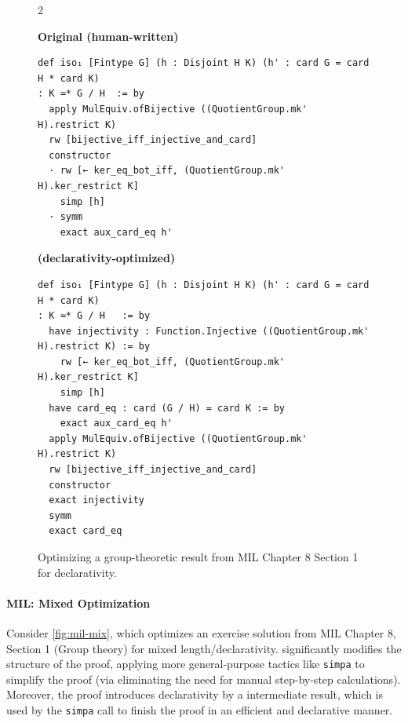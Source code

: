 \setlength{\columnsep}{0.2cm}
\begin{figure}[ht]
\begin{multicols}{2}

{
\textbf{Original (human-written)}
\begin{scriptsize}
\begin{lstlisting}[basicstyle=\scriptsize\ttfamily]
def iso₁ [Fintype G] (h : Disjoint H K) (h' : card G = card H * card K) 
: K ≃* G / H  := by
  apply MulEquiv.ofBijective ((QuotientGroup.mk' H).restrict K)
  rw [bijective_iff_injective_and_card]
  constructor
  · rw [← ker_eq_bot_iff, (QuotientGroup.mk' H).ker_restrict K]
    simp [h]
  · symm
    exact aux_card_eq h'
\end{lstlisting}
\end{scriptsize}
}
\vfill\null
\columnbreak
{
\textbf{\methodname{} (declarativity-optimized)}
\begin{scriptsize}
\begin{lstlisting}[basicstyle=\scriptsize\ttfamily]
def iso₁ [Fintype G] (h : Disjoint H K) (h' : card G = card H * card K) 
: K ≃* G / H   := by
  have injectivity : Function.Injective ((QuotientGroup.mk' H).restrict K) := by
    rw [← ker_eq_bot_iff, (QuotientGroup.mk' H).ker_restrict K]
    simp [h]
  have card_eq : card (G / H) = card K := by
    exact aux_card_eq h'
  apply MulEquiv.ofBijective ((QuotientGroup.mk' H).restrict K)
  rw [bijective_iff_injective_and_card]
  constructor
  exact injectivity
  symm
  exact card_eq
\end{lstlisting}
\end{scriptsize}
}
\end{multicols}
\vspace{-2.5em}
\caption{Optimizing a group-theoretic result from MIL Chapter 8 Section 1 for declarativity.}
\label{fig:ex2-MIL-read}
\vspace{-1em}
\end{figure}



\vspace{15px}
\paragraph{MIL: Mixed Optimization}

Consider \autoref{fig:mil-mix}, which optimizes an exercise solution from MIL Chapter 8, Section 1 (Group theory) for mixed length/declarativity. \methodname{} significantly modifies the structure of the proof, applying more general-purpose tactics like \texttt{simpa} to simplify the proof (via eliminating the need for manual step-by-step calculations). Moreover, the proof introduces declarativity by a intermediate result, which is used by the \texttt{simpa} call to finish the proof in an efficient and declarative manner.


